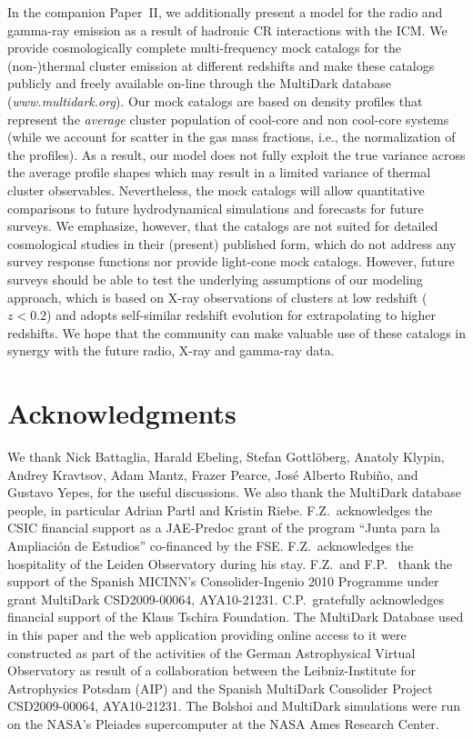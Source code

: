 \documentclass[useAMS,usenatbib]{mn2e}
\begin{document}
{  In the companion Paper~II, we additionally present a model for the radio and
  gamma-ray emission as a result of hadronic CR interactions with the ICM.  We
  provide cosmologically complete multi-frequency mock catalogs for the
  \mbox{(non-)thermal} cluster emission at different redshifts and make these
  catalogs publicly and freely available on-line through the MultiDark database
  (\textit{www.multidark.org}). Our mock catalogs are based on density profiles
  that represent the {\em average} cluster population of cool-core and non
  cool-core systems (while we account for scatter in the gas mass fractions,
  i.e., the normalization of the profiles). As a result, our model does not
  fully exploit the true variance across the average profile shapes which may
  result in a limited variance of thermal cluster observables. Nevertheless, the
  mock catalogs will allow quantitative comparisons to future hydrodynamical
  simulations and forecasts for future surveys.  We emphasize, however, that the
  catalogs are not suited for detailed cosmological studies in their (present)
  published form, which do not address any survey response functions nor provide
  light-cone mock catalogs. However, future surveys should be able to test the
  underlying assumptions of our modeling approach, which is based on X-ray
  observations of clusters at low redshift ($z<0.2$) and adopts self-similar
  redshift evolution for extrapolating to higher redshifts. We hope that the
  community can make valuable use of these catalogs in synergy with the future
  radio, X-ray and gamma-ray data.}



\section*{Acknowledgments}
We thank Nick Battaglia, Harald Ebeling, Stefan Gottl{\"o}berg, Anatoly Klypin,
Andrey Kravtsov, Adam Mantz, Frazer Pearce, Jos\'e Alberto Rubi\~no, and Gustavo
Yepes, for the useful discussions. We also thank the MultiDark database people,
in particular Adrian Partl and Kristin Riebe.  F.Z.{\ }acknowledges the CSIC
financial support as a JAE-Predoc grant of the program ``Junta para la
Ampliaci\'on de Estudios'' co-financed by the FSE.  F.Z.{\ }acknowledges the
hospitality of the Leiden Observatory during his stay.  F.Z.{\ }and F.P.{\ }
thank the support of the Spanish MICINN's Consolider-Ingenio 2010 Programme
under grant MultiDark CSD2009-00064, AYA10-21231. C.P.{\ }gratefully acknowledges financial
support of the Klaus Tschira Foundation. The MultiDark Database used in this
paper and the web application providing online access to it were constructed as
part of the activities of the German Astrophysical Virtual Observatory as result
of a collaboration between the Leibniz-Institute for Astrophysics Potsdam (AIP)
and the Spanish MultiDark Consolider Project CSD2009-00064, AYA10-21231. 
The Bolshoi and MultiDark simulations were run on the NASA's Pleiades supercomputer 
at the NASA Ames Research Center.
\end{document}
